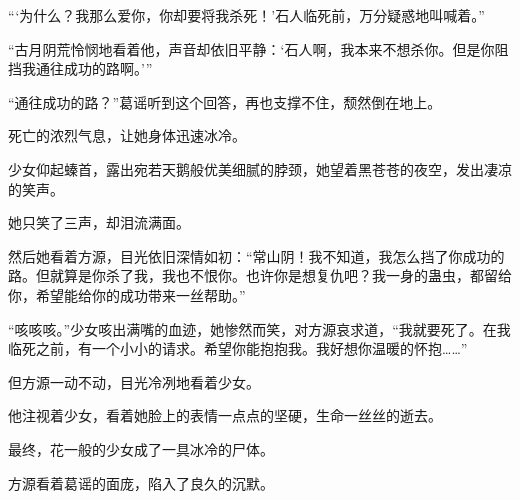 \begin{this_body}
“‘为什么？我那么爱你，你却要将我杀死！’石人临死前，万分疑惑地叫喊着。”

“古月阴荒怜悯地看着他，声音却依旧平静：‘石人啊，我本来不想杀你。但是你阻挡我通往成功的路啊。’”

“通往成功的路？”葛谣听到这个回答，再也支撑不住，颓然倒在地上。

死亡的浓烈气息，让她身体迅速冰冷。

少女仰起螓首，露出宛若天鹅般优美细腻的脖颈，她望着黑苍苍的夜空，发出凄凉的笑声。

她只笑了三声，却泪流满面。

然后她看着方源，目光依旧深情如初：“常山阴！我不知道，我怎么挡了你成功的路。但就算是你杀了我，我也不恨你。也许你是想复仇吧？我一身的蛊虫，都留给你，希望能给你的成功带来一丝帮助。”

“咳咳咳。”少女咳出满嘴的血迹，她惨然而笑，对方源哀求道，“我就要死了。在我临死之前，有一个小小的请求。希望你能抱抱我。我好想你温暖的怀抱……”

但方源一动不动，目光冷冽地看着少女。

他注视着少女，看着她脸上的表情一点点的坚硬，生命一丝丝的逝去。

最终，花一般的少女成了一具冰冷的尸体。

方源看着葛谣的面庞，陷入了良久的沉默。

\end{this_body}

